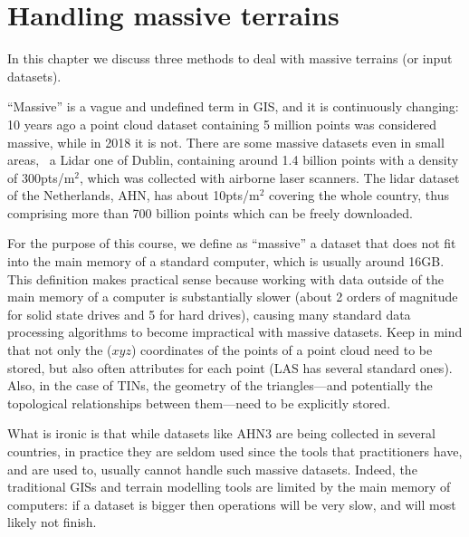 
\setchapterpreamble[u]{\margintoc}

\chapter{Handling massive terrains}
\label{chap:massive}


\graphicspath{{massive/}}


In this chapter we discuss three methods to deal with massive terrains (or input datasets).

%

``Massive'' is a vague and undefined term in GIS, and it is continuously changing: 10 years ago a point cloud dataset containing 5 million points was considered massive, while in 2018 it is not.
There are some massive datasets even in small areas, \eg\ a Lidar one of Dublin, containing around 1.4 billion points with a density of 300pts/m$^2$, which was collected with airborne laser scanners.
The lidar dataset of the Netherlands, AHN, has about 10pts/m$^2$ covering the whole country, thus comprising more than 700 billion points which can be freely downloaded.

%

For the purpose of this course, we define as ``massive'' a dataset that does not fit into the main memory of a standard computer, which is usually around 16GB\@.
This definition makes practical sense because working with data outside of the main memory of a computer is substantially slower (about 2 orders of magnitude for solid state drives and 5 for hard drives), causing many standard data processing algorithms to become impractical with massive datasets.
Keep in mind that not only the ($xyz$) coordinates of the points of a point cloud need to be stored, but also often attributes for each point (LAS has several standard ones).
Also, in the case of TINs, the geometry of the triangles---and potentially the topological relationships between them---need to be explicitly stored.

%

What is ironic is that while datasets like AHN3 are being collected in several countries, in practice they are seldom used since the tools that practitioners have, and are used to, usually cannot handle such massive datasets. 
Indeed, the traditional GISs and terrain modelling tools are limited by the main memory of computers: if a dataset is bigger then operations will be very slow, and will most likely not finish.



